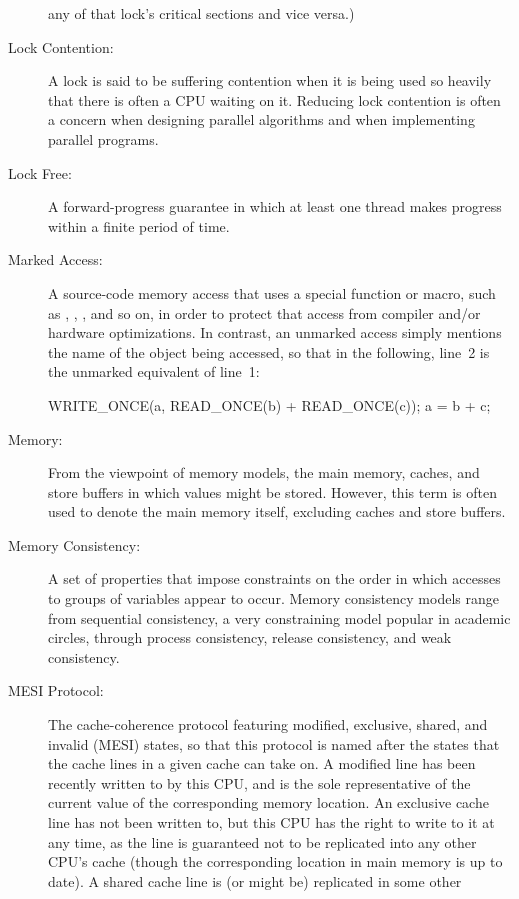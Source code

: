 \begin{description}
	any of that lock's critical sections and vice versa.)
\item[Lock Contention:]
	A lock is said to be suffering contention when it is being
	used so heavily that there is often a CPU waiting on it.
	Reducing lock contention is often a concern when designing
	parallel algorithms and when implementing parallel programs.
\item[Lock Free:]
	A forward-progress guarantee in which at least one thread makes
	progress within a finite period of time.
\item[Marked Access:]
	A source-code memory access that uses a special function or
	macro, such as , ,
	, and so on, in order to protect that access
	from compiler and/or hardware optimizations.
	In contrast, an unmarked access simply mentions the name of
	the object being accessed, so that in the following, line~2
	is the unmarked equivalent of line~1:
	\begin{VerbatimN}
	WRITE_ONCE(a, READ_ONCE(b) + READ_ONCE(c));
	a = b + c;
	\end{VerbatimN}
\item[Memory:]
	From the viewpoint of memory models, the main memory,
	caches, and store buffers in which values might be stored.
	However, this term is often used to denote the main memory
	itself, excluding caches and store buffers.
\item[Memory Consistency:]
	A set of properties that impose constraints on the order in
	which accesses to groups of variables appear to occur.
	Memory consistency models range from sequential consistency,
	a very constraining model popular in academic circles, through
	process consistency, release consistency, and weak consistency.
\item[MESI Protocol:]
	The
	cache-coherence protocol featuring
	modified, exclusive, shared, and invalid (MESI) states,
	so that this protocol is named after the states that the
	cache lines in a given cache can take on.
	A modified line has been recently written to by this CPU,
	and is the sole representative of the current value of
	the corresponding memory location.
	An exclusive cache line has not been written to, but this
	CPU has the right to write to it at any time, as the line
	is guaranteed not to be replicated into any other CPU's cache
	(though the corresponding location in main memory is up to date).
	A shared cache line is (or might be) replicated in some other

\end{description}
